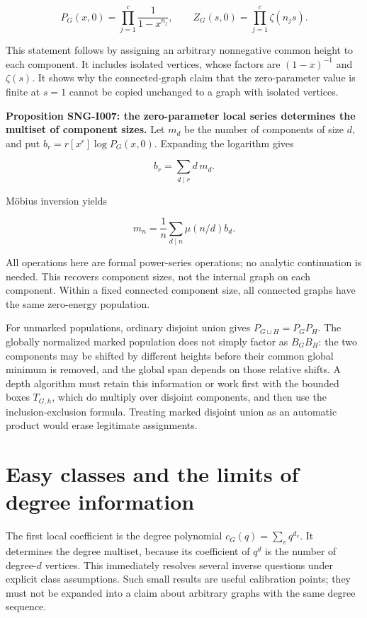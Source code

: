 \documentclass[
  11pt,
  a4paper,
]{report}
\begin{document}
\[
P_G(x,0)=\prod_{j=1}^c\frac1{1-x^{n_j}},
\qquad
Z_G(s,0)=\prod_{j=1}^c\zeta(n_js).
\tag{SNG-I006}
\]

This statement follows by assigning an arbitrary nonnegative common
height to each component. It includes isolated vertices, whose factors
are \((1-x)^{-1}\) and \(\zeta(s)\). It shows why the connected-graph
claim that the zero-parameter value is finite at \(s=1\) cannot be
copied unchanged to a graph with isolated vertices.

\textbf{Proposition SNG-I007: the zero-parameter local series determines
the multiset of component sizes.} Let \(m_d\) be the number of
components of size \(d\), and put \(b_r=r[x^r]\log P_G(x,0)\). Expanding
the logarithm gives

\[
b_r=\sum_{d\mid r}d\,m_d.
\]

Möbius inversion yields

\[
m_n=\frac1n\sum_{d\mid n}\mu(n/d)b_d.
\]

All operations here are formal power-series operations; no analytic
continuation is needed. This recovers component sizes, not the internal
graph on each component. Within a fixed connected component size, all
connected graphs have the same zero-energy population.

For unmarked populations, ordinary disjoint union gives
\(P_{G\sqcup H}=P_GP_H\). The globally normalized marked population does
not simply factor as \(B_GB_H\): the two components may be shifted by
different heights before their common global minimum is removed, and the
global span depends on those relative shifts. A depth algorithm must
retain this information or work first with the bounded boxes
\(T_{G,h}\), which do multiply over disjoint components, and then use
the inclusion-exclusion formula. Treating marked disjoint union as an
automatic product would erase legitimate assignments.

\hypertarget{easy-classes-and-the-limits-of-degree-information}{%
\section{Easy classes and the limits of degree
information}\label{easy-classes-and-the-limits-of-degree-information}}

The first local coefficient is the degree polynomial
\(c_G(q)=\sum_vq^{d_v}\). It determines the degree multiset, because its
coefficient of \(q^d\) is the number of degree-\(d\) vertices. This
immediately resolves several inverse questions under explicit class
assumptions. Such small results are useful calibration points; they must
not be expanded into a claim about arbitrary graphs with the same degree
sequence.
\end{document}

